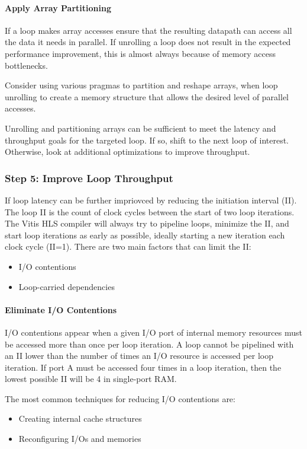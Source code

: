 \paragraph{Apply Array Partitioning}
If a loop makes array accesses ensure that the resulting datapath can access all the data it needs in parallel. If unrolling a loop does not result in the expected performance improvement, this is almost always because of memory access bottlenecks.

\par Consider using various pragmas to partition and reshape arrays, when loop unrolling to create a memory structure that allows the desired level of parallel accesses.

\par Unrolling and partitioning arrays can be sufficient to meet the latency and throughput goals for the targeted loop. If so, shift to the next loop of interest. Otherwise, look at additional optimizations to improve throughput.

\subsubsection{Step 5: Improve Loop Throughput}
If loop latency  can be further impriovced by reducing the initiation interval (II). The loop II is the count of clock cycles between the start of two loop iterations. The Vitis HLS compiler will always try to pipeline loops, minimize the II, and start loop iterations as early as possible, ideally starting a new iteration each clock cycle (II=1). There are two main factors that can limit the II:
\begin{itemize}
    \item I/O contentions
    \item Loop-carried dependencies
\end{itemize}

\paragraph{Eliminate I/O Contentions}
I/O contentions appear when a given I/O port of internal memory resources must be accessed more than once per loop iteration. A loop cannot be pipelined with an II lower than the number of times an I/O resource is accessed per loop iteration. \eg If port A must be accessed four times in a
loop iteration, then the lowest possible II will be 4 in single-port RAM.

The most common techniques for reducing I/O contentions are:
\begin{itemize}
    \item Creating internal cache structures
    \item Reconfiguring I/Os and memories
\end{itemize}

